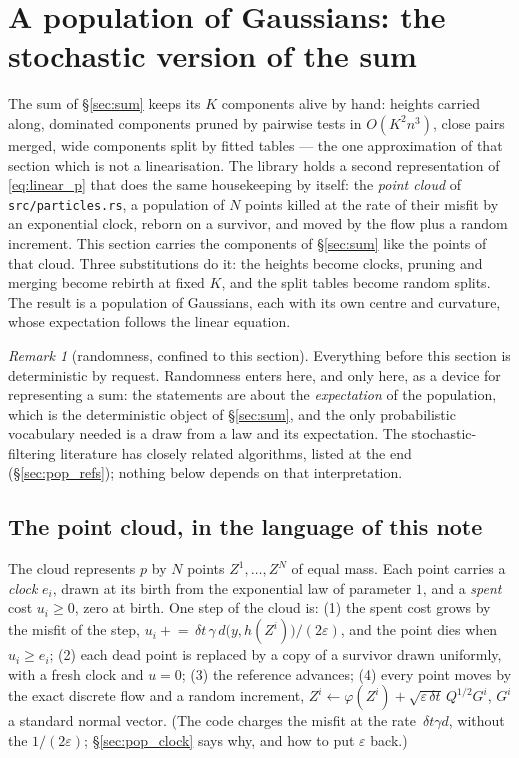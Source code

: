 \documentclass[11pt,a4paper]{article}
\newcommand{\eps}{\varepsilon}
\newcommand{\dt}{\,\delta t}
\theoremstyle{plain}
\theoremstyle{definition}
\theoremstyle{remark}
\newtheorem{remark}{Remark}
\begin{document}
\section{A population of Gaussians: the stochastic version of the sum}
\label{sec:pop}

The sum of \S\ref{sec:sum} keeps its $K$ components alive by hand: heights carried along, dominated components pruned by pairwise tests in $O(K^2n^3)$, close pairs merged, wide components split by fitted tables --- the one approximation of that section which is not a linearisation. The library holds a second representation of \eqref{eq:linear_p} that does the same housekeeping by itself: the \emph{point cloud} of \texttt{src/particles.rs}, a population of $N$ points killed at the rate of their misfit by an exponential clock, reborn on a survivor, and moved by the flow plus a random increment. This section carries the components of \S\ref{sec:sum} like the points of that cloud. Three substitutions do it: the heights become clocks, pruning and merging become rebirth at fixed $K$, and the split tables become random splits. The result is a population of Gaussians, each with its own centre and curvature, whose expectation follows the linear equation.

\begin{remark}[randomness, confined to this section]
Everything before this section is deterministic by request. Randomness enters here, and only here, as a device for representing a sum: the statements are about the \emph{expectation} of the population, which is the deterministic object of \S\ref{sec:sum}, and the only probabilistic vocabulary needed is a draw from a law and its expectation. The stochastic-filtering literature has closely related algorithms, listed at the end (\S\ref{sec:pop_refs}); nothing below depends on that interpretation.
\end{remark}

\subsection{The point cloud, in the language of this note}
\label{sec:pop_cloud}

The cloud represents $p$ by $N$ points $Z^1,\dots,Z^N$ of equal mass. Each point carries a \emph{clock} $e_i$, drawn at its birth from the exponential law of parameter $1$, and a \emph{spent} cost $u_i\ge0$, zero at birth. One step of the cloud is: (1) the spent cost grows by the misfit of the step, $u_i\mathrel{+}=\dt\,\gamma\,d\big(y,h(Z^i)\big)/(2\eps)$, and the point dies when $u_i\ge e_i$; (2) each dead point is replaced by a copy of a survivor drawn uniformly, with a fresh clock and $u=0$; (3) the reference advances; (4) every point moves by the exact discrete flow and a random increment, $Z^i\leftarrow\varphi(Z^i)+\sqrt{\eps\dt}\,Q^{1/2}G^i$, $G^i$ a standard normal vector. (The code charges the misfit at the rate $\dt\gamma d$, without the $1/(2\eps)$; \S\ref{sec:pop_clock} says why, and how to put $\eps$ back.)
\end{document}
